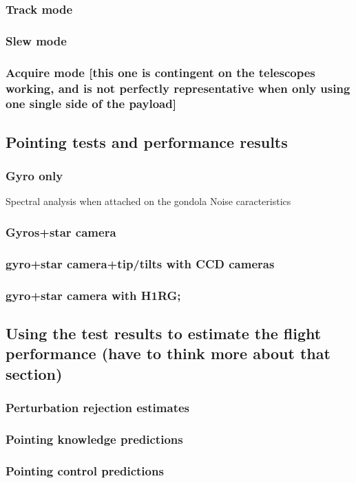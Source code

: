 \subsubsection{Track mode}
\subsubsection{	Slew mode}
\subsubsection{	Acquire mode [this one is contingent on the telescopes working, and is not perfectly representative when only using one single side of the payload]}
\subsection{	Pointing tests and performance results}
\subsubsection{Gyro only}
Spectral analysis when attached on the gondola
Noise caracteristics
\subsubsection{	Gyros+star camera}
\subsubsection{	gyro+star camera+tip/tilts with CCD cameras}
\subsubsection{	gyro+star camera with H1RG;}
\subsection{	Using the test results to estimate the flight performance (have to think more about that section)}
\subsubsection{	Perturbation rejection estimates}
\subsubsection{	Pointing knowledge predictions}
\subsubsection{	Pointing control predictions}
